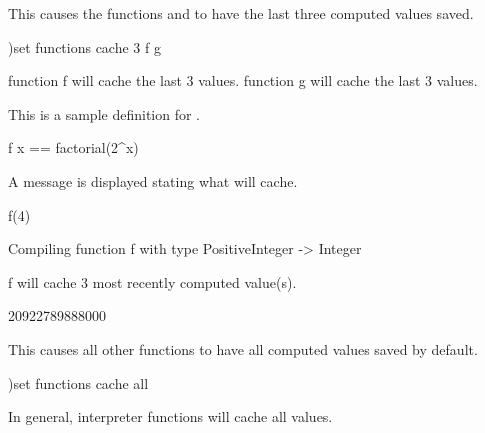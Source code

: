 \begin{xtc}
\begin{xtccomment}
This causes the functions  and  to have
the last three computed values saved.
\end{xtccomment}
\begin{spadsrc}
)set functions cache 3 f g 
\end{spadsrc}
\begin{SysCmdOutput}
   function f will cache the last 3 values.
   function g will cache the last 3 values.
\end{SysCmdOutput}
\end{xtc}
\begin{xtc}
\begin{xtccomment}
This is a sample definition for .
\end{xtccomment}
\begin{spadsrc}
f x == factorial(2^x) 
\end{spadsrc}
\end{xtc}
\begin{xtc}
\begin{xtccomment}
A message is displayed stating what  will cache.
\end{xtccomment}
\begin{spadsrc}
f(4) 
\end{spadsrc}
\begin{MessageOutput}
   Compiling function f with type PositiveInteger -> Integer 
\end{MessageOutput}
\begin{MessageOutput}
   f will cache 3 most recently computed value(s).
\end{MessageOutput}
\begin{TeXOutput}
\begin{fricasmath}{2}
20922789888000%
\end{fricasmath}
\end{TeXOutput}
\end{xtc}
\begin{xtc}
\begin{xtccomment}
This causes all other functions to have all computed values saved by
default.
\end{xtccomment}
\begin{spadsrc}
)set functions cache all
\end{spadsrc}
\begin{SysCmdOutput}
   In general, interpreter functions will cache all values.
\end{SysCmdOutput}
\end{xtc}
